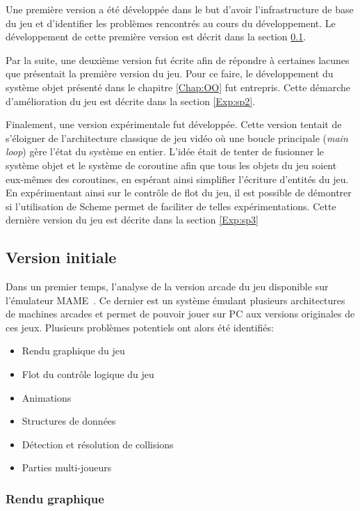 \documentclass[12pt,oneside,letterpaper,francais]{book}
\begin{document}
Une première version a été développée dans le but d'avoir
l'infrastructure de base du jeu et d'identifier les problèmes
rencontrés au cours du développement. Le développement de cette
première version est décrit dans la section \ref{Exp:sp1}.

Par la suite, une deuxième version fut écrite afin de répondre à
certaines lacunes que présentait la première version du jeu. Pour ce
faire, le développement du système objet présenté dans le chapitre
\ref{Chap:OO} fut entrepris. Cette démarche d'amélioration du jeu est
décrite dans la section \ref{Exp:sp2}.

Finalement, une version expérimentale fut développée. Cette version
tentait de s'éloigner de l'architecture classique de jeu vidéo où une
boucle principale (\textit{main loop}) gère l'état du système en
entier. L'idée était de tenter de fusionner le système objet et le
système de coroutine afin que tous les objets du jeu soient eux-mêmes
des coroutines, en espérant ainsi simplifier l'écriture d'entités du
jeu. En expérimentant ainsi sur le contrôle de flot du jeu, il est
possible de démontrer si l'utilisation de Scheme permet de faciliter
de telles expérimentations. Cette dernière version du jeu est décrite
dans la section \ref{Exp:sp3}


\subsection{Version initiale}
\label{Exp:sp1}

Dans un premier temps, l'analyse de la version arcade du jeu
disponible sur l'émulateur MAME~\cite{MAME}. Ce dernier est un système
émulant plusieurs architectures de machines arcades et permet de
pouvoir jouer sur PC aux versions originales de ces jeux. Plusieurs
problèmes potentiels ont alors été identifiés:

\begin{itemize}
\item Rendu graphique du jeu
\item Flot du contrôle logique du jeu
\item Animations
\item Structures de données
\item Détection et résolution de collisions
\item Parties multi-joueurs
\end{itemize}

\subsubsection{Rendu graphique}
\end{document}
